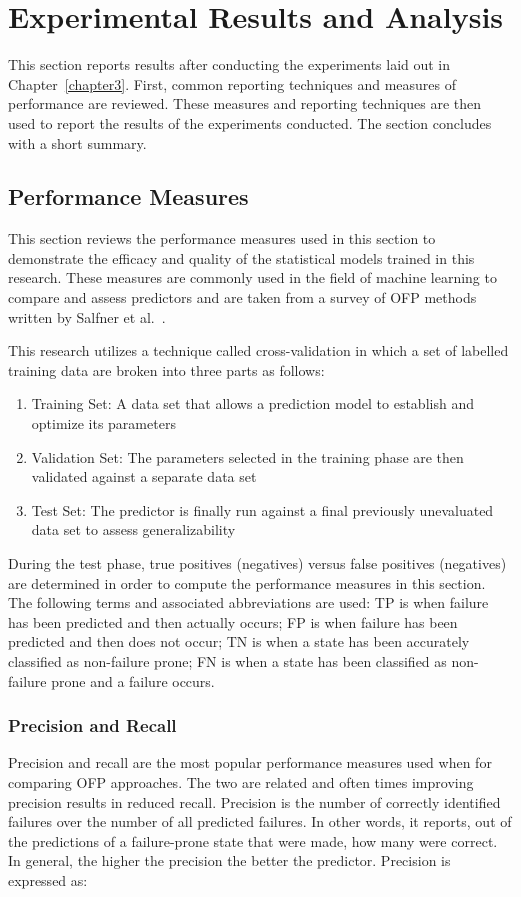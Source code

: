 \section{Experimental Results and Analysis} \label{chapter4}
This section reports results after conducting the experiments laid out in
Chapter~\ref{chapter3}.  First, common reporting techniques and measures of
performance are reviewed.  These measures and reporting techniques are then
used to report the results of the experiments conducted.  The section concludes
with a short summary.

\subsection{Performance Measures} \label{metrics}
This section reviews the performance measures used in this section to
demonstrate the efficacy and quality of the statistical models trained in this
research.  These measures are commonly used in the field of machine learning to
compare and assess predictors and are taken from a survey of \ac{OFP} methods
written by Salfner et al.~\cite{salfnerSurvey}.

This research utilizes a technique called cross-validation in which a set of
labelled training data are broken into three parts as follows:
\begin{enumerate}
\item{Training Set:  A data set that allows a prediction model to establish and
optimize its parameters}
\item{Validation Set:  The parameters selected in the training phase are then
validated against a separate data set}
\item{Test Set:  The predictor is finally run against a final previously
unevaluated data set to assess generalizability}
\end{enumerate}
During the test phase, true positives (negatives) versus false positives
(negatives) are determined in order to compute the performance measures in this
section.  The following terms and associated abbreviations are used: \ac{TP} is
when failure has been predicted and then actually occurs; \ac{FP} is when
failure has been predicted and then does not occur; \ac{TN} is when a state has
been accurately classified as non-failure prone; \ac{FN} is when a state has
been classified as non-failure prone and a failure occurs.

\subsubsection{Precision and Recall}
Precision and recall are the most popular performance measures used when
for comparing \ac{OFP} approaches.  The two are related and often times
improving precision results in reduced recall.  Precision is the number of
correctly identified failures over the number of all predicted failures.  In
other words, it reports, out of the predictions of a failure-prone state that
were made, how many were correct.  In general, the higher the precision the
better the predictor.  Precision is expressed as:


